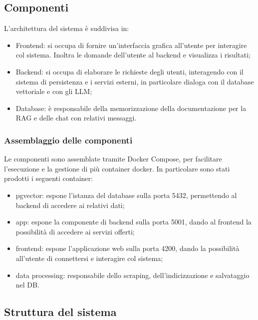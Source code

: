 \subsection{Componenti}
L'architettura del sistema è suddivisa in:
\begin{itemize}
    \item Frontend: si occupa di fornire un'interfaccia grafica all'utente per interagire col sistema. Inoltra le domande dell'utente al backend e visualizza i risultati;
    \item Backend: si occupa di elaborare le richieste degli utenti, interagendo con il sistema di persistenza e i servizi esterni, in particolare dialoga con il database vettoriale e con gli LLM;
    \item Database: è responsabile della memorizzazione della documentazione per la RAG e delle chat con relativi messaggi.
\end{itemize}
\subsubsection{Assemblaggio delle componenti}
Le componenti sono assemblate tramite Docker Compose, per facilitare l'esecuzione e la gestione di più container docker. 
In particolare sono stati prodotti i seguenti container:
\begin{itemize}
    \item pgvector: espone l'istanza del database sulla porta 5432, permettendo al backend di accedere ai relativi dati;
    \item app: espone la componente di backend sulla porta 5001, dando al frontend la possibilità di accedere ai servizi offerti;
    \item frontend: espone l'applicazione web sulla porta 4200, dando la possibilità all'utente di connettersi e interagire col sistema;
    \item data processing: responsabile dello scraping, dell'indicizzazione e salvataggio nel DB.
\end{itemize}
\subsection{Struttura del sistema}
